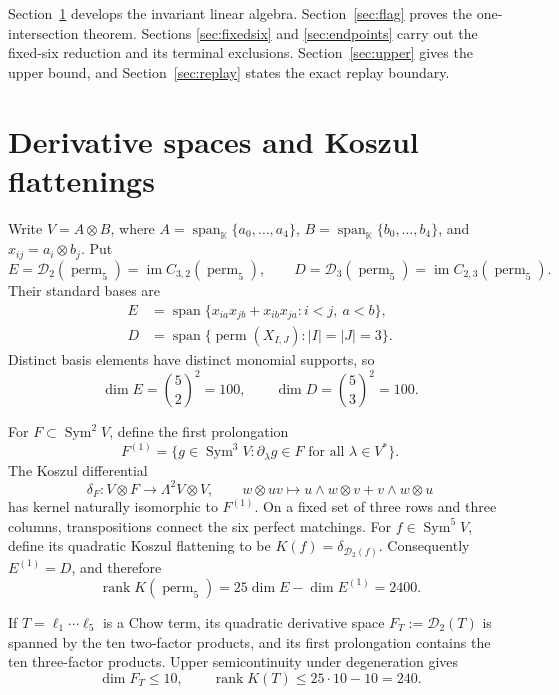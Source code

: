 \documentclass[11pt,reqno]{amsart}
\theoremstyle{definition}
\newcommand{\K}{\mathbb K}
\newcommand{\Sym}{\operatorname{Sym}}
\newcommand{\rank}{\operatorname{rank}}
\newcommand{\im}{\operatorname{im}}
\newcommand{\Span}{\operatorname{span}}
\newcommand{\perm}{\operatorname{perm}}
\newcommand{\cD}{\mathcal D}
\begin{document}
Section~\ref{sec:foundations} develops the invariant linear algebra.
Section~\ref{sec:flag} proves the one-intersection theorem. Sections
\ref{sec:fixedsix} and \ref{sec:endpoints} carry out the fixed-six reduction
and its terminal exclusions. Section~\ref{sec:upper} gives the upper bound,
and Section~\ref{sec:replay} states the exact replay boundary.

\section{Derivative spaces and Koszul flattenings}\label{sec:foundations}

Write \(V=A\otimes B\), where \(A=\Span_{\K}\{a_0,\ldots,a_4\}\),
\(B=\Span_{\K}\{b_0,\ldots,b_4\}\), and \(x_{ij}=a_i\otimes b_j\). Put
\[
 E=\cD_2(\perm_5)=\im C_{3,2}(\perm_5),\qquad
 D=\cD_3(\perm_5)=\im C_{2,3}(\perm_5).
\]
Their standard bases are
\begin{align}
 E&=\Span\{x_{ia}x_{jb}+x_{ib}x_{ja}:i<j,\ a<b\},\label{eq:E}\\
 D&=\Span\{\perm(X_{I,J}):|I|=|J|=3\}.
\end{align}
Distinct basis elements have distinct monomial supports, so
\[
 \dim E=\binom52^2=100,\qquad \dim D=\binom53^2=100.
\]

For \(F\subset\Sym^2V\), define the first prolongation
\[
 F^{(1)}=\{g\in\Sym^3V:\partial_\lambda g\in F
 \text{ for all }\lambda\in V^*\}.
\]
The Koszul differential
\[
 \delta_F:V\otimes F\longrightarrow\Lambda^2V\otimes V,
 \qquad w\otimes uv\longmapsto
 u\wedge w\otimes v+v\wedge w\otimes u
\]
has kernel naturally isomorphic to \(F^{(1)}\). On a fixed set of three rows
and three columns, transpositions connect the six perfect matchings.
For \(f\in\Sym^5V\), define its quadratic Koszul flattening to be
\(K(f)=\delta_{\cD_2(f)}\). Consequently \(E^{(1)}=D\), and therefore
\begin{equation}\label{eq:Kperm}
 \rank K(\perm_5)=25\dim E-\dim E^{(1)}=2400.
\end{equation}

If \(T=\ell_1\cdots\ell_5\) is a Chow term, its quadratic derivative space
\(F_T:=\cD_2(T)\) is spanned by the ten two-factor products, and its first prolongation
contains the ten three-factor products. Upper semicontinuity under degeneration
gives
\begin{equation}\label{eq:single}
 \dim F_T\le10,\qquad \rank K(T)\le25\cdot10-10=240.
\end{equation}
\end{document}
